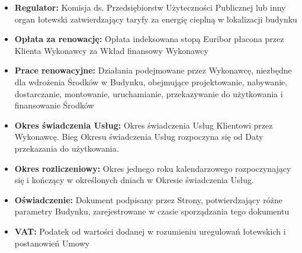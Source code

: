 \begin{multicols}{2}
\begin{itemize}[label={}]
	\item\textbf{Regulator:} Komisja ds. Przedsiębiorstw Użyteczności Publicznej lub inny organ łotewski zatwierdzający taryfy za energię cieplną w lokalizacji budynku
	\item\textbf{Opłata za renowację:} Opłata indeksowana stopą Euribor płacona przez Klienta Wykonawcy za Wkład finansowy Wykonawcy
	\item\textbf{Prace renowacyjne:} Działania podejmowane przez Wykonawcę, niezbędne dla wdrożenia Środków w Budynku, obejmujące projektowanie, nabywanie, dostarczanie, montowanie, uruchamianie, przekazywanie do użytkowania i finansowanie Środków
	\item\textbf{Okres świadczenia Usług:} Okres świadczenia Usług Klientowi przez Wykonawcę. Bieg Okresu świadczenia Usług rozpoczyna się od Daty przekazania do użytkowania.
	\item\textbf{Okres rozliczeniowy:} Okres jednego roku kalendarzowego rozpoczynający się i kończący w określonych dniach w Okresie świadczenia Usług.
	\item\textbf{Oświadczenie:} Dokument podpisany przez Strony, potwierdzający różne parametry Budynku, zarejestrowane w czasie sporządzania tego dokumentu
	\item\textbf{VAT:} Podatek od wartości dodanej w rozumieniu uregulowań łotewskich i postanowień Umowy
\end{itemize}


\end{multicols}
